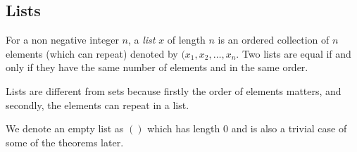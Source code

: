 \documentclass[../../linear_algebra.tex]{subfiles}
\begin{document}
\subsection{Lists}
For a non negative integer $n$, a \emph{list} $x$ of length $n$ is an ordered collection of $n$ elements (which can repeat) denoted by $(x_{1}, x_{2}, \ldots, x_{n}$. Two lists are equal if and only if they have the same number of elements and in the same order.\newline

Lists are different from sets because firstly the order of elements matters, and secondly, the elements can repeat in a list.\newline

We denote an empty list as $()$ which has length $0$ and is also a trivial case of some of the theorems later.
\end{document}
